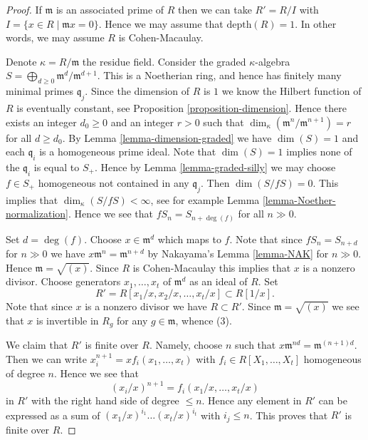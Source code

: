 \begin{proof}
If $\mathfrak m$ is an associated prime of $R$ then we
can take $R' = R/I$ with $I = \{x \in R \mid \mathfrak mx = 0\}$.
Hence we may assume that $\text{depth}(R) = 1$. In other words, we
may assume $R$ is Cohen-Macaulay.

\medskip\noindent
Denote $\kappa = R/\mathfrak m$ the residue field.
Consider the graded $\kappa$-algebra
$S = \bigoplus_{d \geq 0} \mathfrak m^d/\mathfrak m^{d + 1}$.
This is a Noetherian ring, and hence has finitely many
minimal primes $\mathfrak q_j$.
Since the dimension of $R$ is $1$ we know the Hilbert function
of $R$ is eventually constant, see Proposition \ref{proposition-dimension}.
Hence there exists an integer $d_0 \geq 0$ and an integer
$r > 0$ such that $\dim_\kappa(\mathfrak m^n/\mathfrak m^{n + 1}) = r$ for
all $d \geq d_0$.
By Lemma \ref{lemma-dimension-graded} we have $\dim(S) = 1$
and each $\mathfrak q_i$ is a homogeneous prime ideal.
Note that $\dim(S) = 1$ implies
none of the $\mathfrak q_i$ is equal to $S_{+}$.
Hence by Lemma \ref{lemma-graded-silly} we may choose
$f \in S_{+}$ homogeneous not contained in any $\mathfrak q_j$.
Then $\dim(S/fS) = 0$. This implies that $\dim_\kappa(S/fS) < \infty$,
see for example Lemma \ref{lemma-Noether-normalization}.
Hence we see that $fS_n = S_{n + \deg(f)}$ for all $n \gg 0$.

\medskip\noindent
Set $d = \deg(f)$. Choose $x \in \mathfrak m^d$ which maps
to $f$. Note that since $fS_n = S_{n + d}$ for $n \gg 0$ we have
$x\mathfrak m^n = \mathfrak m^{n + d}$ by Nakayama's Lemma \ref{lemma-NAK}
for $n \gg 0$. Hence $\mathfrak m = \sqrt{(x)}$. Since $R$ is
Cohen-Macaulay this implies that $x$ is a nonzero divisor.
Choose generators $x_1, \ldots, x_t$ of $\mathfrak m^d$
as an ideal of $R$. Set
$$
R' = R[x_1/x, x_2/x, \ldots, x_t/x] \subset R[1/x].
$$
Note that since $x$ is a nonzero divisor we have $R \subset R'$.
Since $\mathfrak m = \sqrt{(x)}$ we see that $x$ is invertible in
$R_g$ for any $g \in \mathfrak m$, whence (3).

\medskip\noindent
We claim that $R'$ is finite over $R$. Namely, choose $n$ such that
$x\mathfrak m^{nd} = \mathfrak m^{(n + 1)d}$. Then we can write
$x_i^{n + 1} = xf_i(x_1, \ldots, x_t)$ with $f_i \in R[X_1, \ldots, X_t]$
homogeneous of degree $n$. Hence we see that
$$
(x_i/x)^{n + 1} = f_i(x_1/x, \ldots, x_t/x)
$$
in $R'$ with the right hand side of degree $\leq n$. Hence any
element in $R'$ can be expressed as a sum of
$(x_1/x)^{i_1} \ldots (x_t/x)^{i_t}$ with $i_j \leq n$. This proves
that $R'$ is finite over $R$.


\end{proof}
